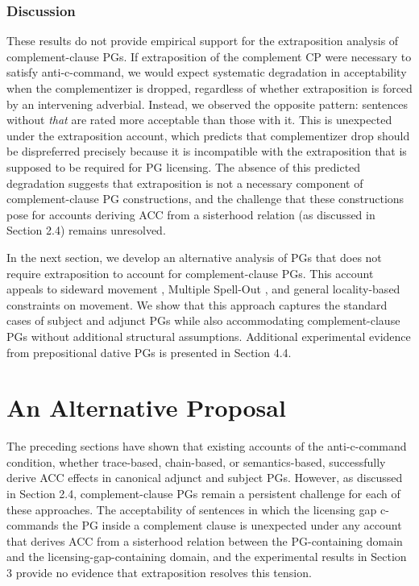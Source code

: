 \documentclass[12pt]{article}
\begin{document}
\subsubsection{Discussion}
These results do not provide empirical support for the extraposition analysis of complement-clause PGs. If extraposition of the complement CP were necessary to satisfy anti-c-command, we would expect systematic degradation in acceptability when the complementizer is dropped, regardless of whether extraposition is forced by an intervening adverbial. Instead, we observed the opposite pattern: sentences without \textit{that} are rated more acceptable than those with it. This is unexpected under the extraposition account, which predicts that complementizer drop should be dispreferred precisely because it is incompatible with the extraposition that is supposed to be required for PG licensing. The absence of this predicted degradation suggests that extraposition is not a necessary component of complement-clause PG constructions, and the challenge that these constructions pose for accounts deriving ACC from a sisterhood relation (as discussed in Section 2.4) remains unresolved.

In the next section, we develop an alternative analysis of PGs that does not require extraposition to account for complement-clause PGs. This account appeals to sideward movement \citep{nunes2000, nunes2004}, Multiple Spell-Out \citep{uriagereka1999}, and general locality-based constraints on movement. We show that this approach captures the standard cases of subject and adjunct PGs while also accommodating complement-clause PGs without additional structural assumptions. Additional experimental evidence from prepositional dative PGs is presented in Section 4.4.

\section{An Alternative Proposal}

The preceding sections have shown that existing accounts of the anti-c-command condition, whether trace-based, chain-based, or semantics-based, successfully derive ACC effects in canonical adjunct and subject PGs. However, as discussed in Section 2.4, complement-clause PGs remain a persistent challenge for each of these approaches. The acceptability of sentences in which the licensing gap c-commands the PG inside a complement clause is unexpected under any account that derives ACC from a sisterhood relation between the PG-containing domain and the licensing-gap-containing domain, and the experimental results in Section 3 provide no evidence that extraposition resolves this tension.
\end{document}
